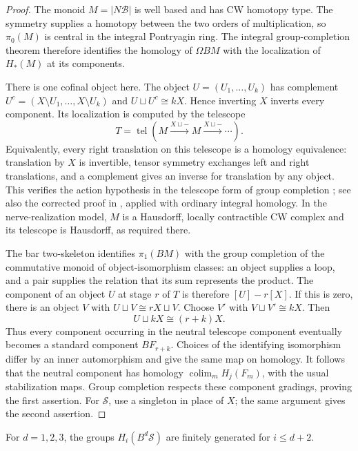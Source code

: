 \begin{proof}
The monoid $M=|N\mathcal B|$ is well based and has CW homotopy type.
The symmetry supplies a homotopy between the two orders of
multiplication, so $\pi_0(M)$ is central in the integral Pontryagin
ring.  The integral group-completion theorem
\cite[Proposition~1]{McDuffSegal1976} therefore identifies the
homology of $\Omega BM$ with the localization of $H_*(M)$ at its
components.

There is one cofinal object here.  The object
$U=(U_1,\ldots,U_k)$ has complement
$U^c=(X\setminus U_1,\ldots,X\setminus U_k)$ and
$U\sqcup U^c\cong kX$.  Hence inverting $X$ inverts every
component.  Its localization is computed by the telescope
\[
 T=\operatorname{tel}(M\xrightarrow{X\sqcup-}M
                  \xrightarrow{X\sqcup-}\cdots).
\]
Equivalently, every right translation on this telescope is a
homology equivalence: translation by $X$ is invertible, tensor
symmetry exchanges left and right translations, and a complement
gives an inverse for translation by any object.  This verifies the
action hypothesis in the telescope form of group completion \cite[Proposition~2 and p.~281]{McDuffSegal1976};
see also the corrected proof in
\cite[Theorem~4.1]{MillerPalmer2015}, applied with ordinary integral
homology.  In the nerve-realization model, $M$ is a Hausdorff,
locally contractible CW complex and its telescope is Hausdorff,
as required there.

The bar two-skeleton identifies $\pi_1(BM)$ with the group
completion of the commutative monoid of object-isomorphism classes:
an object supplies a loop, and a pair supplies the relation that
its sum represents the product.  The component of an object $U$
at stage $r$ of $T$ is therefore $[U]-r[X]$.  If this is zero,
there is an object $V$ with
$U\sqcup V\cong rX\sqcup V$.  Choose $V'$ with
$V\sqcup V'\cong kX$.  Then
\[
 U\sqcup kX\cong(r+k)X.
\]
Thus every component occurring in the neutral telescope component
eventually becomes a standard component $BF_{r+k}$.  Choices of
the identifying isomorphism differ by an inner automorphism and
give the same map on homology.  It follows that the neutral
component has homology $\operatorname{colim}_m H_j(F_m)$, with
the usual stabilization maps.  Group completion respects these
component gradings, proving the first assertion.  For
$\mathcal S$, use a singleton in place of $X$; the same argument
gives the second assertion.
\end{proof}

\begin{lemma}\label{lem:hom-finite-set-bars}
For $d=1,2,3$, the groups $H_i(B^d\mathcal S)$ are finitely
generated for $i\leq d+2$.
\end{lemma}

